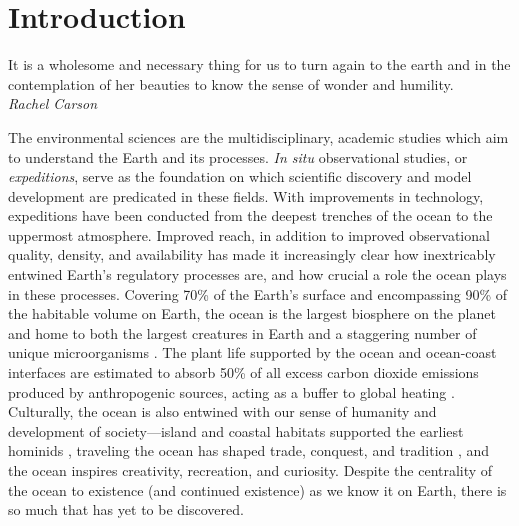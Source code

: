 \chapter{Introduction}
\label{chap:intro}

\begin{center}
    \begin{minipage}{0.7\textwidth}
      \begin{small}
       It is a wholesome and necessary thing for us to turn again to the earth and in the contemplation of her beauties to know the sense of wonder and humility.\\ \emph{Rachel Carson}
      \end{small}
    \end{minipage}
    \vspace{0.5cm}
\end{center}



The environmental sciences are the multidisciplinary, academic studies which aim to understand the Earth and its processes.
\emph{In situ} observational studies, or \emph{expeditions}, serve as the foundation on which scientific discovery and model development are predicated in these fields.
With improvements in technology, expeditions have been conducted from the deepest trenches of the ocean to the uppermost atmosphere.
Improved reach, in addition to improved observational quality, density, and availability has made it increasingly clear how inextricably entwined Earth's regulatory processes are, and how crucial a role the ocean plays in these processes.
Covering 70\% of the Earth's surface and encompassing 90\% of the habitable volume on Earth, the ocean is the largest biosphere on the planet and home to both the largest creatures in Earth and a staggering number of unique microorganisms \autocite{cario2019exploring,purkis2022remote}.
The plant life supported by the ocean and ocean-coast interfaces are estimated to absorb 50\% of all excess carbon dioxide emissions produced by anthropogenic sources, acting as a buffer to global heating \autocite{hori2019blue}.
Culturally, the ocean is also entwined with our sense of humanity and development of society---island and coastal habitats supported the earliest hominids \autocite{erlandson2006oceans}, traveling the ocean has shaped trade, conquest, and tradition \autocite{pearson2003indian,chaudhuri1985trade,firth2019understanding,nunn2003nature}, and the ocean inspires creativity, recreation, and curiosity.
Despite the centrality of the ocean to existence (and continued existence) as we know it on Earth, there is so much that has yet to be discovered.

